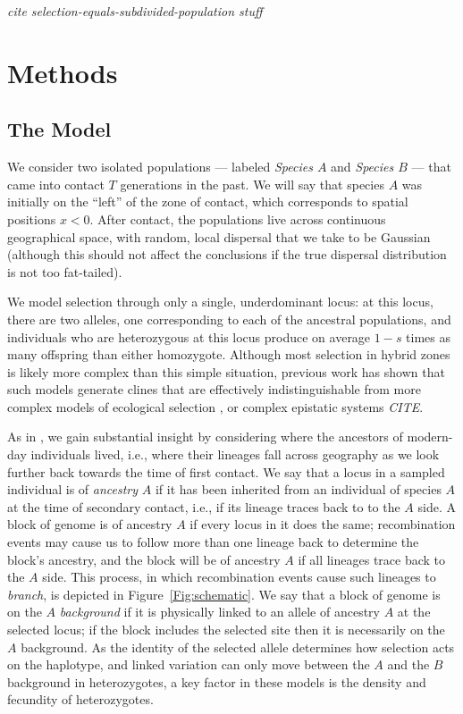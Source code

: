 \documentclass[11pt,letterpaper]{article}
\newcommand{\plr}[1]{{\em \color{blue} #1}}
\begin{document}


\plr{cite selection-equals-subdivided-population stuff}

\section*{Methods}

\subsection*{The Model}

We consider two isolated populations
--- labeled \emph{Species $A$} and \emph{Species $B$} ---  
that came into contact $T$ generations in the past.  
We will say that species $A$ was initially on the ``left'' of the zone of contact, which corresponds to spatial positions $x<0$.  
After contact, the populations live across continuous geographical space,
with random, local dispersal that we take to be Gaussian
(although this should not affect the conclusions if the true dispersal distribution is not too fat-tailed).

We model selection through only a single, underdominant locus:
at this locus, there are two alleles, one corresponding to each of the ancestral populations,
and individuals who are heterozygous at this locus produce on average $1-s$ times as many offspring than either homozygote.
Although most selection in hybrid zones is likely more complex than this simple situation, 
previous work has shown that such models generate clines that are effectively indistinguishable from more complex models of ecological selection \citep{Barton1989, Barton1993},
or complex epistatic systems \plr{CITE}.

As in \citet{Sedghifar2015}, 
we gain substantial insight by considering where the ancestors of modern-day individuals lived,
i.e., where their lineages fall across geography as we look further back towards the time of first contact.
We say that a locus in a sampled individual is of \emph{ancestry} $A$ if it has been inherited from an individual of species $A$ at the time of secondary contact,
i.e., if its lineage traces back to to the $A$ side.
A block of genome is of ancestry $A$ if every locus in it does the same;
recombination events may cause us to follow more than one lineage back to determine the block's ancestry,
and the block will be of ancestry $A$ if all lineages trace back to the $A$ side.
This process, in which recombination events cause such lineages to \emph{branch},
is depicted in Figure~\ref{Fig:schematic}.
We say that a block of genome is on the $A$ \emph{background} if it is physically linked to an allele of ancestry $A$ at the selected locus;
if the block includes the selected site then it is necessarily on the $A$ background.
As the identity of the selected allele determines how selection acts on the haplotype,
and linked variation can only move between the $A$ and the $B$ background in heterozygotes,
a key factor in these models is the density and fecundity of heterozygotes.
\end{document}
